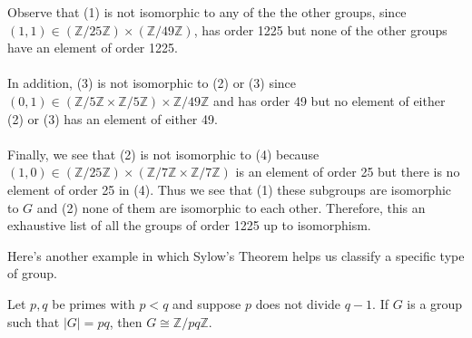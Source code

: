 \documentclass[12pt,letterpaper]{algebra_book}
\theoremstyle{definition}
\begin{document}
    Observe that (1)
    is not isomorphic to any of the the other groups, since $(1, 1)
    \in (\mathbb{Z}/25\mathbb{Z}) \times (\mathbb{Z}/49\mathbb{Z})$,
    has order 1225 but none of the other groups have an element of
    order 1225.
    \\
    \\
    In addition, (3) is not isomorphic to (2) or (3) since $(0, 1) \in
    (\mathbb{Z}/5\mathbb{Z} \times \mathbb{Z}/5\mathbb{Z})
        \times \mathbb{Z}/49\mathbb{Z}$ and has
    order 49
    but no element of either (2) or (3) has an element of either 49. 
    \\
    \\
    Finally, we see that (2) is not isomorphic to (4) because $(1, 0)
    \in (\mathbb{Z}/25\mathbb{Z}) \times
    (\mathbb{Z}/7\mathbb{Z} \times \mathbb{Z}/7\mathbb{Z})$ is an
    element of order 25 but there is no element of order 25 in (4).
    Thus we see that (1) these subgroups are isomorphic to $G$ and (2)
    none of them are isomorphic to each other. Therefore, this an
    exhaustive list of all the groups of order 1225 up to isomorphism.

    Here's another example in which Sylow's Theorem helps us classify
    a specific type of group.

    \begin{thm}
        Let $p,q$ be primes with $p<q$ and suppose $p$ does not divide
        $q-1$.  If $G$ is a group such that $|G| = pq$, then 
        $G \cong \mathbb{Z}/pq\mathbb{Z}$. 
    \end{thm}
\end{document}

